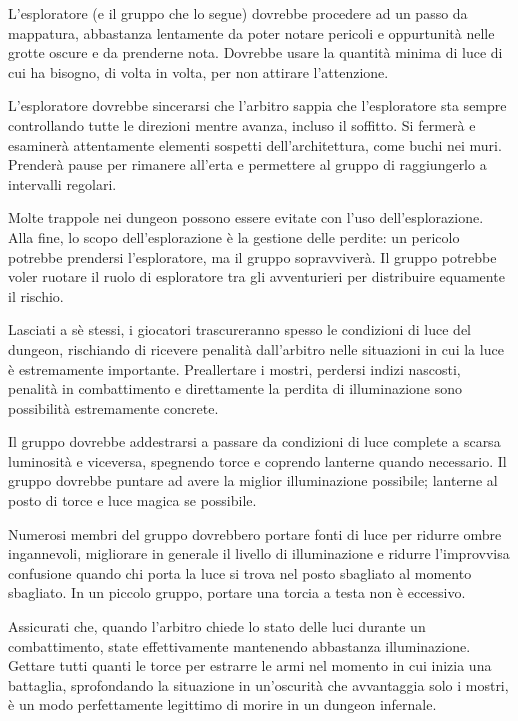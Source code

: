 L'esploratore (e il gruppo che lo segue) dovrebbe procedere ad un passo da mappatura, abbastanza lentamente da poter notare pericoli e oppurtunità nelle grotte oscure e da prenderne nota. Dovrebbe usare la quantità minima di luce di cui ha bisogno, di volta in volta, per non attirare l'attenzione.

L'esploratore dovrebbe sincerarsi che l'arbitro sappia che l'esploratore sta sempre controllando tutte le direzioni mentre avanza, incluso il soffitto. Si fermerà e esaminerà attentamente elementi sospetti dell'architettura, come buchi nei muri. Prenderà pause per rimanere all'erta e permettere al gruppo di raggiungerlo a intervalli regolari.

Molte trappole nei dungeon possono essere evitate con l'uso dell'esplorazione. Alla fine, lo scopo dell'esplorazione è la gestione delle perdite: un pericolo potrebbe prendersi l'esploratore, ma il gruppo sopravviverà. Il gruppo potrebbe voler ruotare il ruolo di esploratore tra gli avventurieri per distribuire equamente il rischio.


Lasciati a sè stessi, i giocatori trascureranno spesso le condizioni di luce del dungeon, rischiando di ricevere penalità dall'arbitro nelle situazioni in cui la luce è estremamente importante. Preallertare i mostri, perdersi indizi nascosti, penalità in combattimento e direttamente la perdita di illuminazione sono possibilità estremamente concrete.

Il gruppo dovrebbe addestrarsi a passare da condizioni di luce complete a scarsa luminosità e viceversa, spegnendo torce e coprendo lanterne quando necessario. Il gruppo dovrebbe puntare ad avere la miglior illuminazione possibile; lanterne al posto di torce e luce magica se possibile.

Numerosi membri del gruppo dovrebbero portare fonti di luce per ridurre ombre ingannevoli, migliorare in generale il livello di illuminazione e ridurre l'improvvisa confusione quando chi porta la luce si trova nel posto sbagliato al momento sbagliato. In un piccolo gruppo, portare una torcia a testa non è eccessivo.

Assicurati che, quando l'arbitro chiede lo stato delle luci durante un combattimento, state effettivamente mantenendo abbastanza illuminazione. Gettare tutti quanti le torce per estrarre le armi nel momento in cui inizia una battaglia, sprofondando la situazione in un'oscurità che avvantaggia solo i mostri, è un modo perfettamente legittimo di morire in un dungeon infernale.

